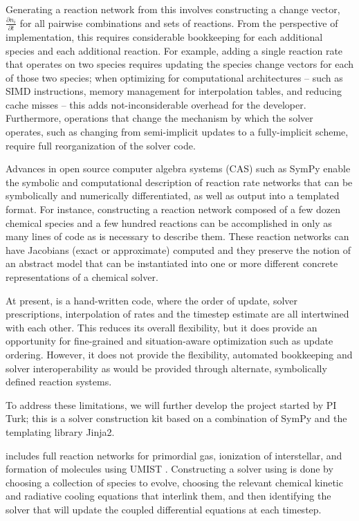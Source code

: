 Generating a reaction network from this involves constructing a change vector,
$\frac{\partial n_i}{\partial t}$ for all pairwise combinations and sets of
reactions.  From the perspective of implementation, this requires considerable
bookkeeping for each additional species and each additional reaction.  For
example, adding a single reaction rate that operates on two species requires
updating the species change vectors for each of those two species; when
optimizing for computational architectures -- such as SIMD instructions, memory
management for interpolation tables, and reducing cache misses -- this adds
not-inconsiderable overhead for the developer.  Furthermore, operations that
change the mechanism by which the solver operates, such as changing from
semi-implicit updates to a fully-implicit scheme, require full reorganization
of the solver code.  

Advances in open source computer algebra systems (CAS) such as SymPy
\citep{10.7717/peerj-cs.103} enable the symbolic and computational description
of reaction rate networks that can be symbolically and numerically
differentiated, as well as output into a templated format.  For instance,
constructing a reaction network composed of a few dozen chemical species and a
few hundred reactions can be accomplished in only as many lines of code as is
necessary to describe them.  These reaction networks can have Jacobians (exact
or approximate) computed and they preserve the notion of an abstract model that
can be instantiated into one or more different concrete representations of a
chemical solver.

At present, \grackle{} is a hand-written code, where the order of update, solver
prescriptions, interpolation of rates and the timestep estimate are all
intertwined with each other.  This reduces its overall flexibility, but it does
provide an opportunity for fine-grained and situation-aware optimization such
as update ordering.  However, it does not provide the flexibility, automated
bookkeeping and solver interoperability as would be provided through alternate,
symbolically defined reaction systems.

To address these limitations, we will further develop the project \dengo{}
started by PI Turk; this is a solver construction kit based on a combination
of SymPy and the templating library Jinja2.  


\dengo{} includes full reaction networks for primordial gas, ionization of
interstellar, and formation of molecules using UMIST
\citep{2013A&A...550A..36M}.  Constructing a solver using \dengo{} is done by
choosing a collection of species to evolve, choosing the relevant chemical
kinetic and radiative cooling equations that interlink them, and then
identifying the solver that will update the coupled differential equations at
each timestep.

